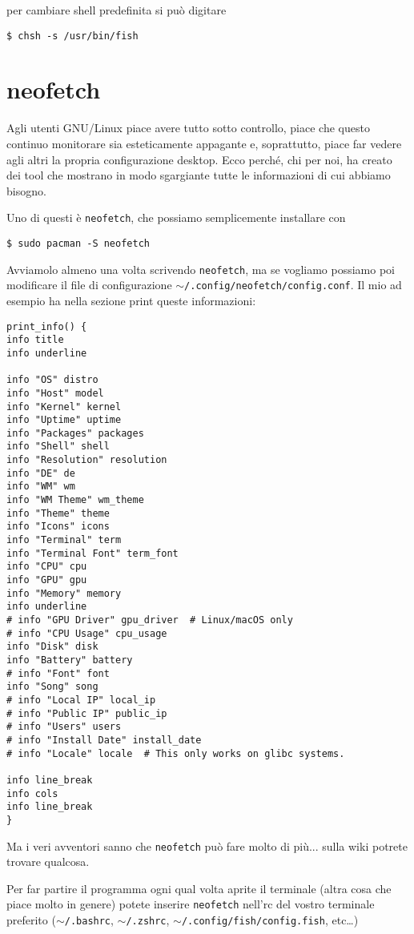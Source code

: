 \documentclass[twoside,italian]{book}
\newcommand{\code}[1]{\texttt{#1}}
\begin{document}
    per cambiare shell predefinita si può digitare 
    \begin{lstlisting}
$ chsh -s /usr/bin/fish
    \end{lstlisting}

\section{neofetch}
    Agli utenti GNU/Linux piace avere tutto sotto controllo, piace che questo continuo monitorare sia esteticamente appagante e, soprattutto, piace far vedere agli altri la propria configurazione desktop. Ecco perché, chi per noi, ha creato dei tool che mostrano in modo sgargiante tutte le informazioni di cui abbiamo bisogno.
    
    Uno di questi è \code{neofetch}, che possiamo semplicemente installare con 
    \begin{lstlisting}
$ sudo pacman -S neofetch
    \end{lstlisting}
    Avviamolo almeno una volta scrivendo \code{neofetch}, ma se vogliamo possiamo poi modificare il file di configurazione \code{$\sim$/.config/neofetch/config.conf}. Il mio ad esempio ha nella sezione print queste informazioni:
\begin{lstlisting}
print_info() {
info title
info underline

info "OS" distro
info "Host" model
info "Kernel" kernel
info "Uptime" uptime
info "Packages" packages
info "Shell" shell
info "Resolution" resolution
info "DE" de
info "WM" wm
info "WM Theme" wm_theme
info "Theme" theme
info "Icons" icons
info "Terminal" term
info "Terminal Font" term_font
info "CPU" cpu
info "GPU" gpu
info "Memory" memory
info underline
# info "GPU Driver" gpu_driver  # Linux/macOS only
# info "CPU Usage" cpu_usage
info "Disk" disk
info "Battery" battery
# info "Font" font
info "Song" song
# info "Local IP" local_ip
# info "Public IP" public_ip
# info "Users" users
# info "Install Date" install_date
# info "Locale" locale  # This only works on glibc systems.

info line_break
info cols
info line_break
}
\end{lstlisting}
    Ma i veri avventori sanno che \code{neofetch} può fare molto di più... sulla wiki potrete trovare qualcosa.
    
    Per far partire il programma ogni qual volta aprite il terminale (altra cosa che piace molto in genere) potete inserire \code{neofetch} nell'rc del vostro terminale preferito (\code{$\sim$/.bashrc}, \code{$\sim$/.zshrc}, \code{$\sim$/.config/fish/config.fish}, etc\dots)
    
\end{document}
